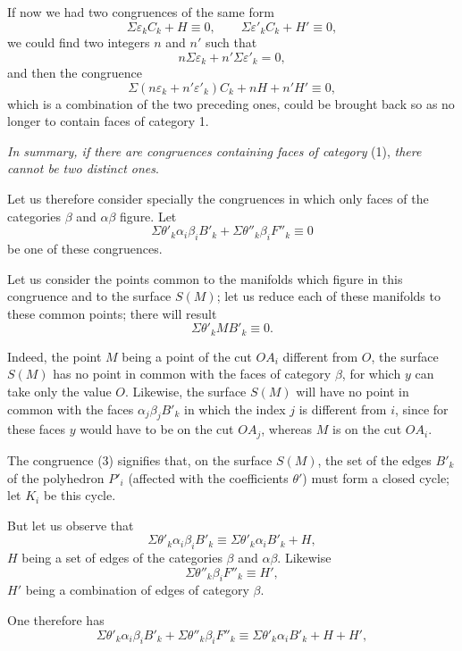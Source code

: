 \documentclass{article}
\begin{document}
If now we had two congruences of the same form
\[ \Sigma \varepsilon_{k} C_{k} + H \equiv 0, \qquad \Sigma \varepsilon'_{k} C_{k} + H' \equiv 0, \]
we could find two integers $n$ and $n'$ such that
\[ n\Sigma \varepsilon_{k} + n'\Sigma \varepsilon'_{k} = 0, \]
and then the congruence
\[ \Sigma (n\varepsilon_{k} + n'\varepsilon'_{k}) C_{k} + nH + n'H' \equiv 0, \]
which is a combination of the two preceding ones, could be brought back so as no longer to contain faces of category 1.


\emph{In summary, if there are congruences containing faces of category} (1), \emph{there cannot be two distinct ones}.

Let us therefore consider specially the congruences in which only faces of the categories $\beta$ and $\alpha\beta$ figure. Let
\[ \Sigma \theta'_{k} \alpha_{i}\beta_{i}B'_{k} + \Sigma \theta''_{k} \beta_{i}F''_{k} \equiv 0 \tag{2} \]
be one of these congruences.

Let us consider the points common to the manifolds which figure in this congruence and to the surface $S(M)$; let us reduce each of these manifolds to these common points; there will result
\[ \Sigma \theta'_{k} MB'_{k} \equiv 0. \tag{3} \]

Indeed, the point $M$ being a point of the cut $OA_{i}$ different from $O$, the surface $S(M)$ has no point in common with the faces of category $\beta$, for which $y$ can take only the value $O$. Likewise, the surface $S(M)$ will have no point in common with the faces $\alpha_{j}\beta_{j}B'_{k}$ in which the index $j$ is different from $i$, since for these faces $y$ would have to be on the cut $OA_{j}$, whereas $M$ is on the cut $OA_{i}$.

The congruence (3) signifies that, on the surface $S(M)$, the set of the edges $B'_{k}$ of the polyhedron $P'_{i}$ (affected with the coefficients $\theta'$) must form a closed cycle; let $K_{i}$ be this cycle.

But let us observe that
\[ \Sigma \theta'_{k} \alpha_{i}\beta_{i}B'_{k} \equiv \Sigma \theta'_{k} \alpha_{i}B'_{k} + H, \]
$H$ being a set of edges of the categories $\beta$ and $\alpha\beta$. Likewise
\[ \Sigma \theta''_{k} \beta_{i}F''_{k} \equiv H', \]
$H'$ being a combination of edges of category $\beta$.

One therefore has
\[ \Sigma \theta'_{k} \alpha_{i}\beta_{i}B'_{k} + \Sigma \theta''_{k} \beta_{i}F''_{k} \equiv \Sigma \theta'_{k} \alpha_{i}B'_{k} + H + H', \]
\end{document}
